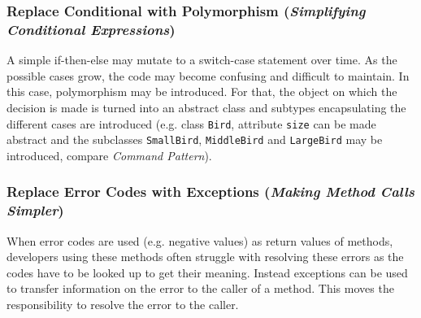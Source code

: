 \subsubsection*{Replace Conditional with Polymorphism (\textit{Simplifying Conditional Expressions})}
A simple if-then-else may mutate to a switch-case statement over time.
As the possible cases grow, the code may become confusing and difficult to maintain.
In this case, polymorphism may be introduced.
For that, the object on which the decision is made is turned into an abstract class and subtypes encapsulating the different cases are introduced
(e.g. class \texttt{Bird}, attribute \texttt{size} can be made abstract and the subclasses \texttt{SmallBird}, \texttt{MiddleBird} and \texttt{LargeBird} may be introduced, compare \textit{Command Pattern}).

\subsubsection*{Replace Error Codes with Exceptions (\textit{Making Method Calls Simpler})}
When error codes are used (e.g. negative values) as return values of methods, developers using these methods often struggle with resolving these errors as the codes have to be looked up to get their meaning.
Instead exceptions can be used to transfer information on the error to the caller of a method.
This moves the responsibility to resolve the error to the caller.

\newpage
